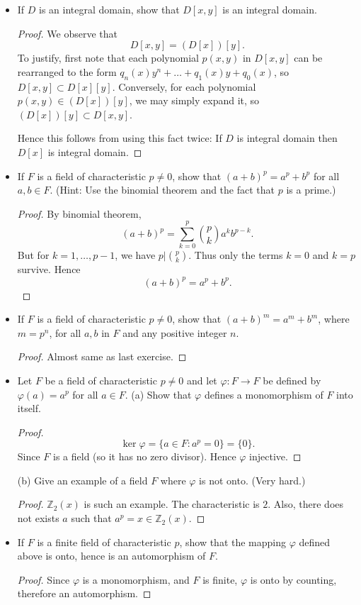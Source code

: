 \begin{itemize}
	\item [4.] If $D$ is an integral domain, show that $D[x, y]$ is an integral domain.
\begin{proof}
	We observe that
	\[
		D[x,y] = (D[x])[y]
	.\] 
	To justify, first note that each polynomial $p(x,y)$ in $D[x,y]$ can be rearranged to the form  $q_n(x) y^n + \ldots + q_1(x) y + q_0(x)$, so $D[x,y] \subset D[x][y]$. Conversely, for each polynomial $p(x,y) \in (D[x])[y]$, we may simply expand it, so $(D[x])[y] \subset D[x,y]$.

	Hence this follows from using this fact twice: If $D$ is integral domain then $D[x]$ is integral domain.
\end{proof}

	\item [7.] If $F$ is a field of characteristic $p \neq 0$, show that $(a+b)^p=a^p+b^p$ for all $a, b \in F$. (Hint: Use the binomial theorem and the fact that $p$ is a prime.)
\begin{proof}
	By binomial theorem,
	\[
		(a+b)^p = \sum_{k=0}^p \binom{p}{k} a^k b^{p-k}
	.\] 
	But for $k = 1, \ldots, p-1$, we have $p | \binom{p}{k}$. Thus only the terms  $k=0$ and  $k=p$ survive. Hence
	 \[
		 (a+b)^p = a^p + b^p
	.\] 
\end{proof}

	\item [8.] If $F$ is a field of characteristic $p \neq 0$, show that $(a+b)^m=a^m+b^m$, where $m=p^n$, for all $a, b$ in $F$ and any positive integer $n$.
\begin{proof}
	Almost same as last exercise.
\end{proof}

	\item [9.] Let $F$ be a field of characteristic $p \neq 0$ and let $\varphi: F \rightarrow F$ be defined by $\varphi(a)=a^p$ for all $a \in F$.
(a) Show that $\varphi$ defines a monomorphism of $F$ into itself.
\begin{proof}
	\[
		\operatorname{ker} \varphi = \{a \in F: a^p = 0\} = \{0\}  
	.\] 
	Since $F$ is a field (so it has no zero divisor). Hence $\varphi$ injective.
\end{proof}

(b) Give an example of a field $F$ where $\varphi$ is not onto. (Very hard.)
\begin{proof}
	$\mathbb{Z}_2(x)$ is such an example. The characteristic is $2$. Also, there does not exists $a$ such that $a^p = x \in \mathbb{Z}_2(x)$.
\end{proof}

\item [10.] If $F$ is a finite field of characteristic $p$, show that the mapping $\varphi$ defined above is onto, hence is an automorphism of $F$.
\begin{proof}
	Since $\varphi$ is a monomorphism, and $F$ is finite, $\varphi$ is onto by counting, therefore an automorphism.
\end{proof}

\end{itemize}
